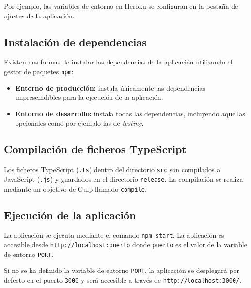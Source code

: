 Por ejemplo, las variables de entorno en Heroku se configuran en la pestaña de ajustes de la aplicación.


\subsection{Instalación de dependencias}

Existen dos formas de instalar las dependencias de la aplicación utilizando el gestor de paquetes \texttt{npm}:

\begin{itemize}
	\item \textbf{Entorno de producción:} instala únicamente las dependencias imprescindibles para la ejecución de la aplicación.
	
	
	\item \textbf{Entorno de desarrollo:} instala todas las dependencias, incluyendo aquellas opcionales como por ejemplo las de \textit{testing}.
	
\end{itemize}

\subsection{Compilación de ficheros TypeScript}

Los ficheros TypeScript (\texttt{.ts}) dentro del directorio \texttt{src} son compilados a JavaScript (\texttt{.js}) y guardados en el directorio \texttt{release}.
La compilación se realiza mediante un objetivo de Gulp llamado \texttt{compile}.



\subsection{Ejecución de la aplicación}

La aplicación se ejecuta mediante el comando \texttt{npm start}. La aplicación es accesible desde \texttt{http://localhost:puerto} donde \texttt{puerto} es el valor de la variable de entorno \texttt{PORT}.

Si no se ha definido la variable de entorno \texttt{PORT}, la aplicación se desplegará por defecto en el puerto \texttt{3000} y será accesible a través de \texttt{http://localhost:3000/}.


